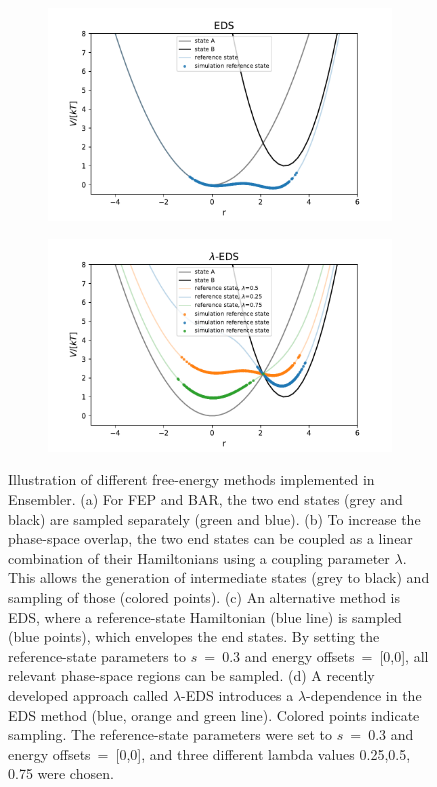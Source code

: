 \begin{figure}
\begin{subfigure}{.45\textwidth}
	\end{subfigure}
	\newline
	\begin{subfigure}{.45\textwidth}
		\caption{}
		\includegraphics[width=\linewidth]{fig/FE_example/EDS_sampling.pdf} 
	\end{subfigure}
	\begin{subfigure}{.45\textwidth}
		\caption{}
		\includegraphics[width=\linewidth]{fig/FE_example/hlEDS_sampling.pdf} 
	\end{subfigure}
	\caption{Illustration of different free-energy methods implemented in Ensembler. (a) For FEP\cite{Zwanzig1954} and BAR\cite{Bennett1976}, the two end states (grey and black) are sampled separately (green and blue). (b) To increase the phase-space overlap, the two end states can be coupled as a linear combination of their Hamiltonians using a coupling parameter $\lambda$. This allows the generation of intermediate states (grey to black) and sampling of those (colored points). (c) An alternative method is EDS,\cite{Christ2007, Christ2008, Christ2009} where a reference-state Hamiltonian (blue line) is sampled (blue points), which envelopes the end states. By setting the reference-state parameters to $s$~=~0.3 and energy offsets~=~[0,0], all relevant phase-space regions can be sampled. (d) A recently developed approach called $\lambda$-EDS\cite{Koenig2020} introduces a $\lambda$-dependence in the EDS method (blue, orange and green line). Colored points indicate sampling. The reference-state parameters were set to $s$~=~0.3 and energy offsets~=~[0,0], and three different lambda values 0.25,0.5, 0.75 were chosen.}
	\label{fig:FE_sampling}
\end{figure}
